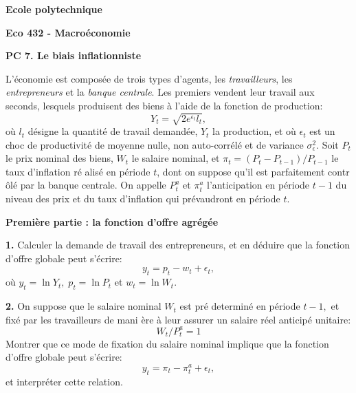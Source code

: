 \documentclass[11pt,a4paper]{article}
\begin{document}
\begin{center}
\textbf{Ecole polytechnique}

\bigskip

\textbf{Eco 432 - Macro\'{e}conomie}

\bigskip

\textbf{PC 7. Le biais inflationniste}

\hspace{1.0in}
\end{center}

\bigskip

L'\'{e}conomie est compos\'{e}e de trois types d'agents, les \textit{%
travailleurs}, les \textit{entrepreneurs} et la \textit{banque centrale}.
Les premiers vendent leur travail aux seconds, lesquels produisent des biens 
\`{a} l'aide de la fonction de production:%
\begin{equation*}
Y_{t}=\sqrt{2e^{\epsilon _{t}}l_{t}},
\end{equation*}%
o\`{u} $l_{t}$ d\'{e}signe la quantit\'{e} de travail demand\'{e}e, $Y_{t}$
la production, et o\`{u} $\epsilon _{t}$ est un choc de productivit\'{e} de
moyenne nulle, non auto-corr\'{e}l\'{e} et de variance $\sigma _{\epsilon
}^{2}$. Soit $P_{t}$ le prix nominal des biens, $W_{t}$ le salaire nominal,
et $\pi _{t}=\left( P_{t}-P_{t-1}\right) /P_{t-1}$ le taux d'inflation r\'{e}%
alis\'{e} en p\'{e}riode $t$, dont on suppose qu'il est parfaitement contr%
\^{o}l\'{e} par la banque centrale. On appelle $P_{t}^{a}$ et $\pi _{t}^{a}$
l'anticipation en p\'{e}riode $t-1$ du niveau des prix et du taux
d'inflation qui pr\'{e}vaudront en p\'{e}riode $t$.

\bigskip

\noindent \textbf{Premi\`{e}re partie : la fonction d'offre agr\'{e}g\'{e}e}

\bigskip

\noindent \textbf{1.} Calculer la demande de travail des entrepreneurs, et
en d\'{e}duire que la fonction d'offre globale peut s'\'{e}crire:%
\begin{equation*}
y_{t}=p_{t}-w_{t}+\epsilon _{t},
\end{equation*}%
o\`{u} $y_{t}=\ln Y_{t},\;p_{t}=\ln P_{t}$ et $w_{t}=\ln W_{t}.$

\noindent \textbf{2.} On suppose que le salaire nominal $W_{t}$ est pr\'{e}%
determin\'{e} en p\'{e}riode $t-1,$ et fix\'{e} par les travailleurs de mani%
\`{e}re \`{a} leur assurer un salaire r\'{e}el anticip\'{e} unitaire: 
\begin{equation*}
W_{t}/P_{t}^{a}=1
\end{equation*}%
Montrer que ce mode de fixation du salaire nominal implique que la fonction
d'offre globale peut s'\'{e}crire:%
\begin{equation*}
y_{t}=\pi _{t}-\pi _{t}^{a}+\epsilon _{t},
\end{equation*}%
et interpr\'{e}ter cette relation.
\end{document}

